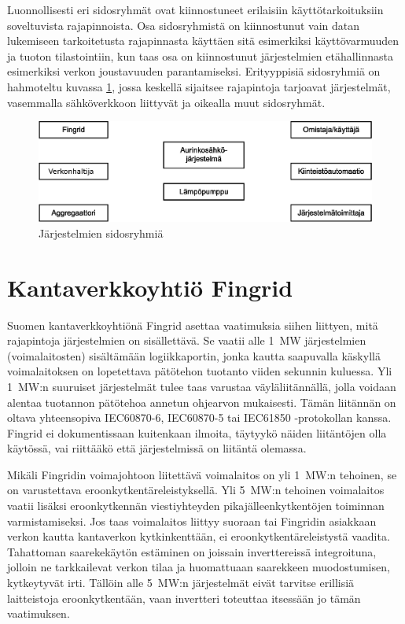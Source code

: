 Luonnollisesti eri sidosryhmät ovat kiinnostuneet erilaisiin käyttötarkoituksiin soveltuvista rajapinnoista. Osa sidosryhmistä on kiinnostunut vain datan lukemiseen tarkoitetusta rajapinnasta käyttäen sitä esimerkiksi käyttövarmuuden ja tuoton tilastointiin, kun taas osa on kiinnostunut järjestelmien etähallinnasta esimerkiksi verkon joustavuuden parantamiseksi. Erityyppisiä sidosryhmiä on hahmoteltu kuvassa \ref{fig:sidosryhmat}, jossa keskellä sijaitsee rajapintoja tarjoavat järjestelmät, vasemmalla sähköverkkoon liittyvät ja oikealla muut sidosryhmät.

\begin{figure}[h]
  \centering
  \includegraphics[width=1\textwidth]{figures/sidosryhmat}
  \caption{Järjestelmien sidosryhmiä}
  \label{fig:sidosryhmat}
\end{figure}

\section{Kantaverkkoyhtiö Fingrid}
  Suomen kantaverkkoyhtiönä Fingrid asettaa vaatimuksia siihen liittyen, mitä rajapintoja järjestelmien on sisällettävä. Se vaatii alle \SI{1}{\mega\watt} järjestelmien (voimalaitosten) sisältämään logiikkaportin, jonka kautta saapuvalla käskyllä voimalaitoksen on lopetettava pätötehon tuotanto viiden sekunnin kuluessa. Yli \SI{1}{\mega\watt}:n suuruiset järjestelmät tulee taas varustaa väyläliitännällä, jolla voidaan alentaa tuotannon pätötehoa annetun ohjearvon mukaisesti. Tämän liitännän on oltava yhteensopiva IEC60870-6, IEC60870-5 tai IEC61850 -protokollan kanssa. Fingrid ei dokumentissaan kuitenkaan ilmoita, täytyykö näiden liitäntöjen olla käytössä, vai riittääkö että järjestelmissä on liitäntä olemassa. \parencite{VJV2018}

  Mikäli Fingridin voimajohtoon liitettävä voimalaitos on yli \SI{1}{\mega\watt}:n tehoinen, se on varustettava eroonkytkentäreleistyksellä. Yli \SI{5}{\mega\watt}:n tehoinen voimalaitos vaatii lisäksi eroonkytkennän viestiyhteyden pikajälleenkytkentöjen toiminnan varmistamiseksi. Jos taas voimalaitos liittyy suoraan tai Fingridin asiakkaan verkon kautta kantaverkon kytkinkenttään, ei eroonkytkentäreleistystä vaadita. Tahattoman saarekekäytön estäminen on joissain inverttereissä integroituna, jolloin ne tarkkailevat verkon tilaa ja huomattuaan saarekkeen muodostumisen, kytkeytyvät irti. Tällöin alle \SI{5}{\mega\watt}:n järjestelmät eivät tarvitse erillisiä laitteistoja eroonkytkentään, vaan invertteri toteuttaa itsessään jo tämän vaatimuksen.

